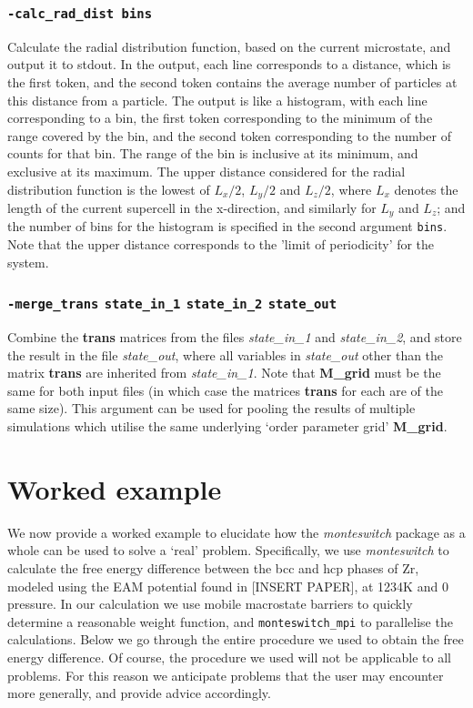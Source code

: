 \documentclass{report}
\begin{document}
\subsection{\texttt{-calc\_rad\_dist bins}}
Calculate the radial distribution function, based on the current microstate, and output it to stdout. In the output, each line corresponds 
to a distance, which is the first token, and the second token contains the average number of particles at this distance from a particle. The 
output is like a histogram, with each line corresponding to a bin, the first token corresponding to the minimum of the range covered by the 
bin, and the second token corresponding to the number of counts for that bin. The range of the bin is inclusive at its minimum, and 
exclusive at its maximum. The upper distance considered for the radial distribution function is the lowest of $L_x/2$, $L_y/2$ and $L_z/2$,
where $L_x$ denotes the length of the current supercell in the x-direction, and similarly for $L_y$ and $L_z$; and the number of bins for 
the histogram is specified in the second argument \texttt{bins}. Note that the upper distance corresponds to the 'limit of periodicity' for the system. 

\subsection{\texttt{-merge\_trans} \texttt{state\_in\_1}  \texttt{state\_in\_2} \texttt{state\_out}}
Combine the \textbf{trans} matrices from the files \emph{state\_in\_1} and \emph{state\_in\_2}, and store the result in the 
file \emph{state\_out}, where all variables in \emph{state\_out} other than the matrix \textbf{trans} are inherited from 
\emph{state\_in\_1}. Note that \textbf{M\_grid} must be the same for both input files (in which case the matrices \textbf{trans} for
each are of the same size). This argument can be used for pooling the results of multiple simulations which utilise the same underlying
`order parameter grid' \textbf{M\_grid}.


\chapter{Worked example}\label{chapter:example}
We now provide a worked example to elucidate how the \emph{monteswitch} package as a whole can be used to solve a `real' problem.
Specifically, we use \emph{monteswitch} to calculate the free energy difference between the bcc and hcp
phases of Zr, modeled using the EAM potential found in [INSERT PAPER], at 1234K and 0 pressure. 
In our calculation we use mobile macrostate barriers to quickly determine a reasonable weight function, and \texttt{monteswitch\_mpi} to
parallelise the calculations. Below we go through the entire procedure we used to obtain the free energy
difference. Of course, the procedure we used will not be applicable to all problems. For this reason we anticipate problems
that the user may encounter more generally, and provide advice accordingly.
\end{document}
